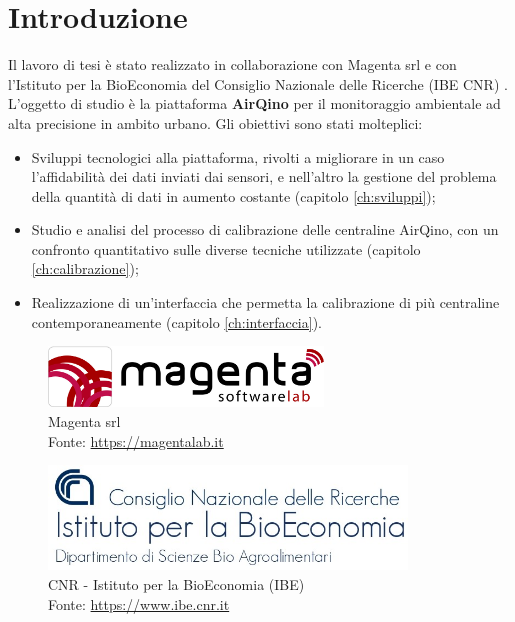 \chapter{Introduzione}\label{ch:introduzione}
Il lavoro di tesi è stato realizzato in collaborazione con Magenta srl \cite{magenta} e con l'Istituto per la BioEconomia del Consiglio Nazionale delle Ricerche (IBE CNR) \cite{ibe}.\\

L'oggetto di studio è la piattaforma \textbf{AirQino} \cite{airqino} per il monitoraggio ambientale ad alta precisione in ambito urbano. Gli obiettivi sono stati molteplici:
\begin{itemize}
  \item Sviluppi tecnologici alla piattaforma, rivolti a migliorare in un caso l'affidabilità dei dati inviati dai sensori, e nell'altro la gestione del problema della quantità di dati in aumento costante (capitolo \ref{ch:sviluppi});
  \item Studio e analisi del processo di calibrazione delle centraline AirQino, con un confronto quantitativo sulle diverse tecniche utilizzate (capitolo \ref{ch:calibrazione});
  \item Realizzazione di un'interfaccia che permetta la calibrazione di più centraline contemporaneamente  (capitolo \ref{ch:interfaccia}).
\end{itemize}

\begin{figure}[H]
\centering
\captionsetup{justification=centering}
\includegraphics[width=0.65\textwidth,height=\textheight,keepaspectratio]{img/magenta}
\caption{Magenta srl\\Fonte: \url{https://magentalab.it}}
\label{fig:magenta}
\end{figure}

\vspace{3mm}
\begin{figure}[H]
\centering
\captionsetup{justification=centering}
\includegraphics[width=0.85\textwidth,height=\textheight,keepaspectratio]{img/ibe.jpg}
\caption{CNR - Istituto per la BioEconomia (IBE)\\Fonte: \url{https://www.ibe.cnr.it}}
\label{fig:ibe}
\end{figure}


